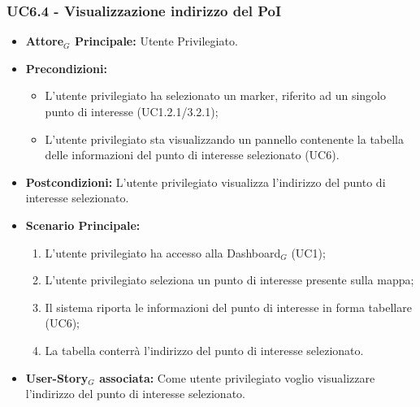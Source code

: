 \documentclass[11pt]{article}
\begin{document}
\begin{justify}
 \subsubsection{\textbf{UC6.4 - Visualizzazione indirizzo del PoI}}
 \begin{itemize}
     \item \textbf{Attore$_G$ Principale:} Utente Privilegiato.
     \item \textbf{Precondizioni:}
       \begin{itemize}
    	        \item L'utente privilegiato ha selezionato un marker, riferito ad un singolo punto di interesse (UC1.2.1/3.2.1);
          \item L'utente privilegiato sta visualizzando un pannello contenente la tabella delle informazioni del punto di interesse selezionato (UC6).
       \end{itemize}
     \item \textbf{Postcondizioni:} L'utente privilegiato visualizza l'indirizzo del punto di interesse selezionato.
     \item \textbf{Scenario Principale:}
        \begin{enumerate}
            \item L'utente privilegiato ha accesso alla Dashboard$_G$ (UC1);
            \item L'utente privilegiato seleziona un punto di interesse presente sulla mappa;
            \item Il sistema riporta le informazioni del punto di interesse in forma tabellare (UC6);
            \item La tabella conterrà l'indirizzo del punto di interesse selezionato.
        \end{enumerate}
     \item \textbf{User-Story$_G$ associata:} Come utente privilegiato voglio visualizzare l'indirizzo del punto di interesse selezionato. 
 \end{itemize}

\end{justify}
\end{document}

